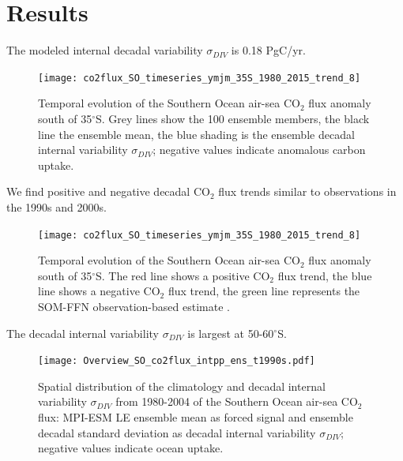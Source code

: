 \documentclass[aspectratio=169]{beamer}
\begin{document}
\section{Results}
\begin{frame}{The modeled internal decadal variability $\sigma_{DIV}$ is 0.18 PgC/yr.} 
\vspace{.45cm}

\begin{figure}%
	\texttt{[image: co2flux\_SO\_timeseries\_ymjm\_35S\_1980\_2015\_trend\_8]}
	\vspace{-2mm}
	\caption{Temporal evolution of the Southern Ocean air-sea CO$_2$ flux anomaly south of 35$^\circ$S. Grey lines show the 100 ensemble members, the black line the ensemble mean, the blue shading is the ensemble decadal internal variability $\sigma_{DIV}$; negative values indicate anomalous carbon uptake.}
	\label{fig:evolution_southern_ocean_carbon_sink}
\end{figure}

\end{frame}	


\begin{frame}{We find positive and negative decadal CO$_2$ flux trends similar to observations in the 1990s and 2000s.} 
\vspace{-.2cm}

\begin{figure}%
	\texttt{[image: co2flux\_SO\_timeseries\_ymjm\_35S\_1980\_2015\_trend\_8]}
	\vspace{-2mm}
	\caption{Temporal evolution of the Southern Ocean air-sea CO$_2$ flux anomaly south of 35$^\circ$S. The red line shows a positive CO$_2$ flux trend, the blue line shows a negative CO$_2$ flux trend, the green line represents the SOM-FFN observation-based estimate \citep{landschuetzer2015}.}
	\label{fig:evolution_southern_ocean_carbon_sink}
\end{figure}
\addtocounter{framenumber}{-1}
\end{frame}	



\begin{frame}{The decadal internal variability $\sigma_{DIV}$ is largest at 50-60$^\circ$S.}

\begin{figure}%
	\centering
	\texttt{[image: Overview\_SO\_co2flux\_intpp\_ens\_t1990s.pdf]} %
		\caption{Spatial distribution of the climatology and decadal internal variability $\sigma_{DIV}$ from 1980-2004 of the Southern Ocean air-sea CO$_2$ flux: MPI-ESM LE ensemble mean as forced signal and ensemble decadal standard deviation as decadal internal variability $\sigma_{DIV}$; negative values indicate ocean uptake.}
	\label{fig:SOCS_ensmean_ensstd}
\end{figure}

\end{frame}
\end{document}
